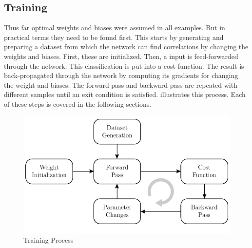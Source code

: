 \subsection{Training}
\label{sec:neural-networks-training}
Thus far optimal weights and biases were assumed in all examples.
But in practical terms they need to be found first.
This starts by generating and preparing a dataset from which the network can find correlations by changing the weights and biases.
First, these are initialized.
Then, a input is feed-forwarded through the network.
This classification is put into a cost function.
The result is back-propagated through the network by computing its gradients for changing the weight and biases.
The forward pass and backward pass are repeated with different samples until an exit condition is satisfied.
 illustrates this process.
Each of these steps is covered in the following sections.
\begin{figure}
	\centering
	\includegraphics{images/training.pdf}
	\caption[Training Process]{Training Process}
	\label{fig:training}
\end{figure}






